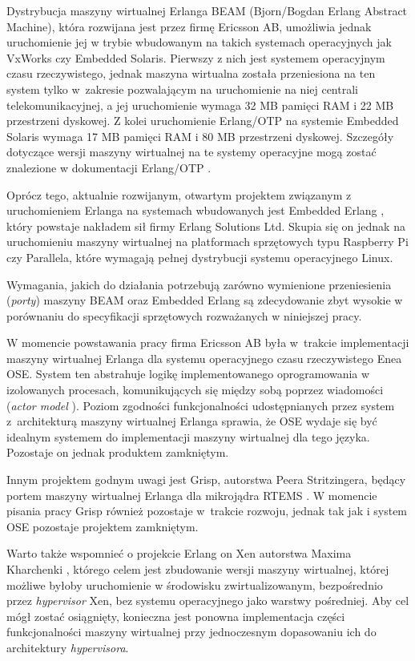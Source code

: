 Dystrybucja maszyny wirtualnej Erlanga BEAM (Bjorn/Bogdan Erlang Abstract Machine), która rozwijana jest przez firmę Ericsson AB, umożliwia jednak uruchomienie jej w trybie wbudowanym na takich systemach operacyjnych jak VxWorks czy Embedded Solaris. Pierwszy z nich jest systemem operacyjnym czasu rzeczywistego, jednak maszyna wirtualna została przeniesiona na ten system tylko w~zakresie pozwalającym na uruchomienie na niej centrali telekomunikacyjnej, a jej uruchomienie wymaga 32 MB pamięci RAM i 22 MB przestrzeni dyskowej.
Z kolei uruchomienie Erlang/OTP na systemie Embedded Solaris wymaga 17 MB pamięci RAM i 80 MB przestrzeni dyskowej.
Szczegóły dotyczące wersji maszyny wirtualnej na te systemy operacyjne mogą zostać znalezione w dokumentacji Erlang/OTP \cite{ErlangVxWorks}.


Oprócz tego, aktualnie rozwijanym, otwartym projektem związanym z uruchomieniem Erlanga na systemach wbudowanych jest Embedded Erlang \cite{ErlangEmbedded}, który powstaje nakładem sił firmy Erlang Solutions Ltd. Skupia się on jednak na uruchomieniu maszyny wirtualnej na platformach sprzętowych typu Raspberry Pi czy Parallela, które wymagają pełnej dystrybucji systemu operacyjnego Linux.


Wymagania, jakich do działania potrzebują zarówno wymienione przeniesienia (\emph{porty}) maszyny BEAM oraz Embedded Erlang są zdecydowanie zbyt wysokie w porównaniu do specyfikacji sprzętowych rozważanych w niniejszej pracy.


W momencie powstawania pracy firma Ericsson AB była w~trakcie implementacji maszyny wirtualnej Erlanga dla systemu operacyjnego czasu rzeczywistego Enea OSE. System ten abstrahuje logikę implementowanego oprogramowania w izolowanych procesach, komunikujących się między sobą poprzez wiadomości (\emph{actor model} \cite{Hewitt73}). Poziom zgodności funkcjonalności udostępnianych przez system z~architekturą maszyny wirtualnej Erlanga sprawia, że OSE wydaje się być idealnym systemem do implementacji maszyny wirtualnej dla tego języka. Pozostaje on jednak produktem zamkniętym.

Innym projektem godnym uwagi jest Grisp, autorstwa Peera Stritzingera, będący portem maszyny wirtualnej Erlanga dla mikrojądra RTEMS \cite{Stritzinger2013}. W momencie pisania pracy Grisp również pozostaje w~trakcie rozwoju, jednak tak jak i system OSE pozostaje projektem zamkniętym.

Warto także wspomnieć o projekcie Erlang on Xen autorstwa Maxima Kharchenki \cite{Kharchenko2012}, którego celem jest zbudowanie wersji maszyny wirtualnej, której możliwe byłoby uruchomienie w środowisku zwirtualizowanym, bezpośrednio przez \emph{hypervisor} Xen, bez systemu operacyjnego jako warstwy pośredniej. Aby cel mógł zostać osiągnięty, konieczna jest ponowna implementacja części funkcjonalności maszyny wirtualnej przy jednoczesnym dopasowaniu ich do architektury \emph{hypervisora}.


